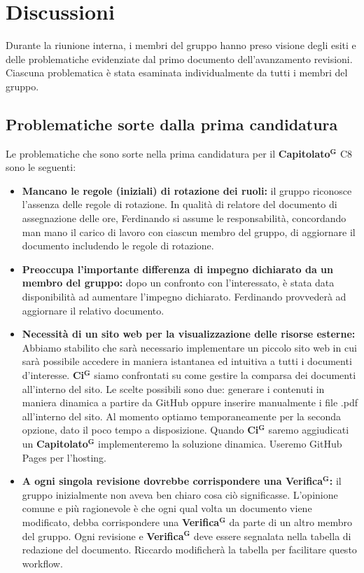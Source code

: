 \documentclass[a4paper,12pt]{article}
\newcommand{\term}[1]{\textbf{#1}$^\mathbf{G}$}
\begin{document}
\section{Discussioni}
Durante la riunione interna, i membri del gruppo hanno preso visione degli esiti e delle problematiche evidenziate dal primo documento dell'avanzamento revisioni. Ciascuna problematica è stata esaminata individualmente da tutti i membri del gruppo.

\subsection{Problematiche sorte dalla prima candidatura}
Le problematiche che sono sorte nella prima candidatura per il \term{Capitolato} C8 sono le seguenti:
\begin{itemize}
    \item \textbf{Mancano le regole (iniziali) di rotazione dei ruoli:} il gruppo riconosce l'assenza delle regole di rotazione. In qualità di relatore del documento di assegnazione delle ore, Ferdinando si assume le responsabilità, concordando man mano il carico di lavoro con ciascun membro del gruppo, di aggiornare il documento includendo le regole di rotazione.
    \item \textbf{Preoccupa l'importante differenza di impegno dichiarato da un membro del gruppo:} dopo un confronto con l'interessato, è stata data disponibilità ad aumentare l'impegno dichiarato. Ferdinando provvederà ad aggiornare il relativo documento. 
    \item \textbf{Necessità di un sito web per la visualizzazione delle risorse esterne:} Abbiamo stabilito che sarà necessario implementare un piccolo sito web in cui sarà possibile accedere in maniera istantanea ed intuitiva a tutti i documenti d'interesse. \term{Ci} siamo confrontati su come gestire la comparsa dei documenti all'interno del sito. Le scelte possibili sono due: generare i contenuti in maniera dinamica a partire da GitHub oppure inserire manualmente i file .pdf all'interno del sito. Al momento optiamo temporaneamente per la seconda opzione, dato il poco tempo a disposizione. Quando \term{Ci} saremo aggiudicati un \term{Capitolato} implementeremo la soluzione dinamica. Useremo GitHub Pages per l'hosting.  
    \item \textbf{A ogni singola revisione dovrebbe corrispondere una \term{Verifica}:} il gruppo inizialmente non aveva ben chiaro cosa ciò significasse. L'opinione comune e più ragionevole è che ogni qual volta un documento viene modificato, debba corrispondere una \term{Verifica} da parte di un altro membro del gruppo. Ogni revisione e \term{Verifica} deve essere segnalata nella tabella di redazione del documento. Riccardo modificherà la tabella per facilitare questo workflow.

\end{itemize}
\end{document}

